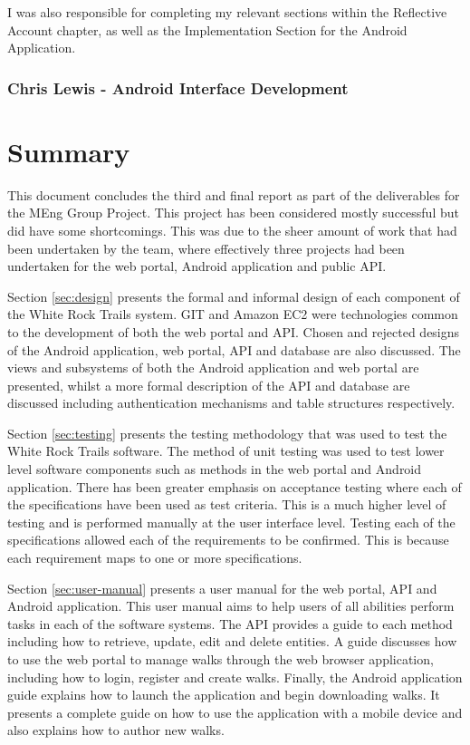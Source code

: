 \documentclass[11pt,a4paper]{report}
\begin{document}
I was also responsible for completing my relevant sections within the Reflective Account chapter, as well as the Implementation Section for the Android Application.

\subsection{Chris Lewis - Android Interface Development}

\chapter*{Summary}
\label{sec:summary}

This document concludes the third and final report as part of the deliverables for the MEng Group Project. This project has been considered mostly successful but did have some shortcomings. This was due to the sheer amount of work that had been undertaken by the team, where effectively three projects had been undertaken for the web portal, Android application and public API.

Section \ref{sec:design} presents the formal and informal design of each component of the White Rock Trails system. GIT and Amazon EC2 were technologies common to the development of both the web portal and API. Chosen and rejected designs of the Android application, web portal, API and database are also discussed. The views and subsystems of both the Android application and web portal are presented, whilst a more formal description of the API and database are discussed including authentication mechanisms and table structures respectively.

Section \ref{sec:testing} presents the testing methodology that was used to test the White Rock Trails software. The method of unit testing was used to test lower level software components such as methods in the web portal and Android application. There has been greater emphasis on acceptance testing where each of the specifications have been used as test criteria. This is a much higher level of testing and is performed manually at the user interface level. Testing each of the specifications allowed each of the requirements to be confirmed. This is because each requirement maps to one or more specifications.

Section \ref{sec:user-manual} presents a user manual for the web portal, API and Android application. This user manual aims to help users of all abilities perform tasks in each of the software systems. The API provides a guide to each method including how to retrieve, update, edit and delete entities. A guide discusses how to use the web portal to manage walks through the web browser application, including how to login, register and create walks. Finally, the Android application guide explains how to launch the application and begin downloading walks. It presents a complete guide on how to use the application with a mobile device and also explains how to author new walks.
\end{document}
